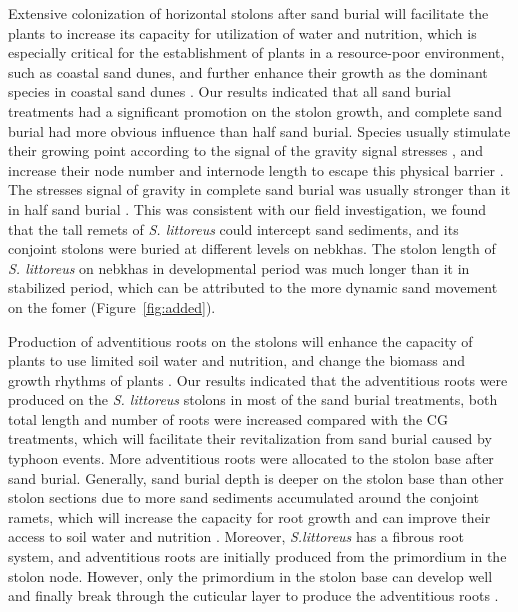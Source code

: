 \documentclass[]{interact}
\theoremstyle{plain}%
\theoremstyle{definition}
\theoremstyle{remark}
\begin{document}
Extensive colonization of horizontal stolons after sand burial will facilitate the plants to increase its capacity for utilization of water and nutrition, which is especially critical for the establishment of plants in a resource-poor environment, such as coastal sand dunes, and further enhance their growth as the dominant species in coastal sand dunes \citep{divyasreeEcologicalStudyReproduction2019,mendoza-gonzalezBiologicalFloraCoastal2014}. Our results indicated that all sand burial treatments had a significant promotion on the  stolon growth, and complete sand burial had more obvious influence than half sand burial. Species usually stimulate their growing point according to the signal of the gravity signal stresses \citep{zhouAnalysisgrowthstrategy2015}, and increase their node number and internode length to escape this physical barrier \citep{maunEffectsBurialSand1996}. The stresses signal of gravity in complete sand burial was usually stronger than it in half sand burial \citep{wangAdvancesStudiesMorphological2005}. This was consistent with our field investigation, we found that the tall remets of \textit{S. littoreus} could intercept sand sediments, and its conjoint stolons were buried at different levels on nebkhas. The stolon length of \textit{S. littoreus} on nebkhas in developmental period was much longer than it in stabilized period, which can be attributed to the more dynamic sand movement on the fomer (Figure~\ref{fig:added}). 

Production of adventitious roots on the stolons will enhance the capacity of plants to use limited soil water and nutrition, and change the biomass and growth rhythms of plants \citep{martinezResponsesDuneMosses1999,dechAdventitiousRootProduction2006}. Our results indicated that the adventitious roots were produced on the \textit{S. littoreus} stolons in most of the sand burial treatments, both total length and number of roots were increased compared with the CG treatments, which will facilitate their revitalization from sand burial caused by typhoon events. More adventitious roots were allocated to the stolon base after sand burial. Generally, sand burial depth is deeper on the stolon base than other stolon sections due to more sand sediments accumulated around the conjoint ramets, which will increase the capacity for root growth and can improve their access to soil water and nutrition \citep{yuanEffectsSandAccretion1993}. Moreover, \textit{S.littoreus} has a fibrous root system, and adventitious roots are initially produced from the primordium in the stolon node. However, only the primordium in the stolon base can develop well and finally break through the cuticular layer to produce the adventitious roots \citep{hochholdingerWeedsCropsGenetic2004}. 
\end{document}
